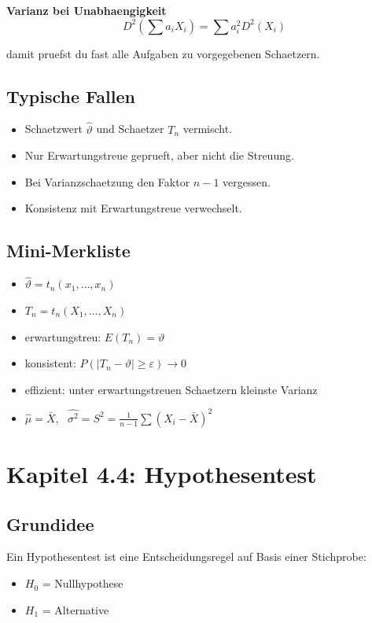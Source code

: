 \documentclass[a4paper,11pt]{article}
\begin{document}
\textbf{Varianz bei Unabhaengigkeit}
\[
D^2\left(\sum a_iX_i\right)=\sum a_i^2D^2(X_i)
\]

damit pruefst du fast alle Aufgaben zu vorgegebenen Schaetzern.

\subsection{Typische Fallen}
\begin{itemize}
  \item Schaetzwert $\hat\vartheta$ und Schaetzer $T_n$ vermischt.
  \item Nur Erwartungstreue geprueft, aber nicht die Streuung.
  \item Bei Varianzschaetzung den Faktor $n-1$ vergessen.
  \item Konsistenz mit Erwartungstreue verwechselt.
\end{itemize}

\subsection{Mini-Merkliste}
\begin{itemize}
  \item $\hat\vartheta=t_n(x_1,\dots,x_n)$
  \item $T_n=t_n(X_1,\dots,X_n)$
  \item erwartungstreu: $E(T_n)=\vartheta$
  \item konsistent: $P(|T_n-\vartheta|\ge\varepsilon)\to 0$
  \item effizient: unter erwartungstreuen Schaetzern kleinste Varianz
  \item $\hat\mu=\bar X$, \ $\widehat{\sigma^2}=S^2=\frac{1}{n-1}\sum (X_i-\bar X)^2$
\end{itemize}

\section{Kapitel 4.4: Hypothesentest}

\subsection{Grundidee}
Ein Hypothesentest ist eine Entscheidungsregel auf Basis einer Stichprobe:
\begin{itemize}
  \item $H_0$ = Nullhypothese
  \item $H_1$ = Alternative
\end{itemize}
\end{document}
